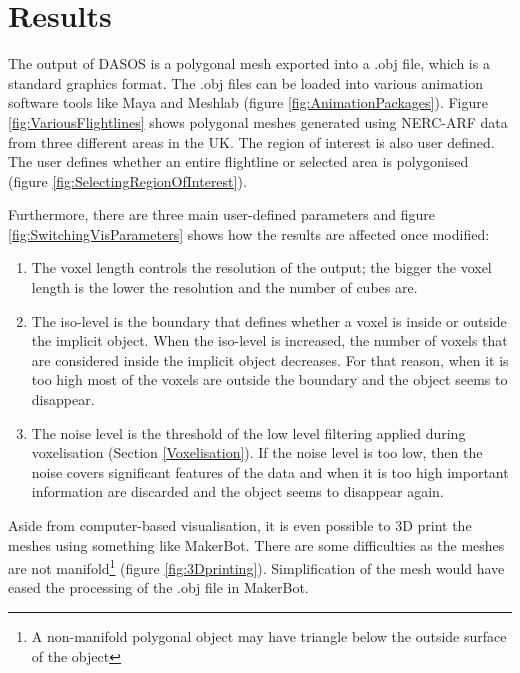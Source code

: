 \documentclass{subfiles}
\begin{document}
\section{Results}\label{sec:MCResults}

\par The output of DASOS is a polygonal mesh exported into a .obj file, which is a standard graphics format. The .obj files can be loaded into various animation software tools like Maya and Meshlab (figure \ref{fig:AnimationPackages}). Figure \ref{fig:VariousFlightlines} shows polygonal meshes generated using NERC-ARF data from three different areas in the UK.  The region of interest is also user defined. The user defines whether an entire flightline or selected area is polygonised (figure \ref{fig:SelectingRegionOfInterest}). 

\par Furthermore, there are three main user-defined parameters and figure \ref{fig:SwitchingVisParameters} shows how the results are affected once modified:
\begin{enumerate}
	\item The voxel length controls the resolution of the output; the bigger the voxel length is the lower the resolution and the number of cubes are.
	\item The iso-level is the boundary that defines whether a voxel is inside or outside the implicit object. When the iso-level is increased, the number of voxels that are considered inside the implicit object decreases. For that reason, when it is too high most of the voxels are outside the boundary and the object seems to disappear.
	\item The noise level is the threshold of the low level filtering applied during voxelisation (Section \ref{Voxelisation}). If the noise level is too low, then the noise covers significant features of the data and when it is too high important information are discarded and the object seems to disappear again.
\end{enumerate}

 
\par Aside from computer-based visualisation, it is even possible to 3D print the meshes using something like MakerBot.  There are some difficulties as the meshes are not manifold\footnote{ A non-manifold polygonal object may have triangle below the outside surface of the object} (figure \ref{fig:3Dprinting}). Simplification of the mesh would have eased the processing of the .obj file in MakerBot. 
 
\end{document}
